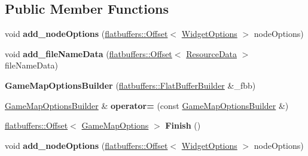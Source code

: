 \subsection*{Public Member Functions}
\begin{DoxyCompactItemize}
\item 
\mbox{\label{structflatbuffers_1_1GameMapOptionsBuilder_a86e4812168cd2031ccef0736fb2c9622}} 
void {\bfseries add\+\_\+node\+Options} (\hyperlink{structflatbuffers_1_1Offset}{flatbuffers\+::\+Offset}$<$ \hyperlink{structflatbuffers_1_1WidgetOptions}{Widget\+Options} $>$ node\+Options)
\item 
\mbox{\label{structflatbuffers_1_1GameMapOptionsBuilder_aa656d921622a241614b306e484c61401}} 
void {\bfseries add\+\_\+file\+Name\+Data} (\hyperlink{structflatbuffers_1_1Offset}{flatbuffers\+::\+Offset}$<$ \hyperlink{structflatbuffers_1_1ResourceData}{Resource\+Data} $>$ file\+Name\+Data)
\item 
\mbox{\label{structflatbuffers_1_1GameMapOptionsBuilder_a3060be639960055b2c1796fcdb5f70f5}} 
{\bfseries Game\+Map\+Options\+Builder} (\hyperlink{classflatbuffers_1_1FlatBufferBuilder}{flatbuffers\+::\+Flat\+Buffer\+Builder} \&\+\_\+fbb)
\item 
\mbox{\label{structflatbuffers_1_1GameMapOptionsBuilder_a727b673a620de85b9562811c508d1fe9}} 
\hyperlink{structflatbuffers_1_1GameMapOptionsBuilder}{Game\+Map\+Options\+Builder} \& {\bfseries operator=} (const \hyperlink{structflatbuffers_1_1GameMapOptionsBuilder}{Game\+Map\+Options\+Builder} \&)
\item 
\mbox{\label{structflatbuffers_1_1GameMapOptionsBuilder_a188d269b583bb889447caca11f181878}} 
\hyperlink{structflatbuffers_1_1Offset}{flatbuffers\+::\+Offset}$<$ \hyperlink{structflatbuffers_1_1GameMapOptions}{Game\+Map\+Options} $>$ {\bfseries Finish} ()
\item 
\mbox{\label{structflatbuffers_1_1GameMapOptionsBuilder_a86e4812168cd2031ccef0736fb2c9622}} 
void {\bfseries add\+\_\+node\+Options} (\hyperlink{structflatbuffers_1_1Offset}{flatbuffers\+::\+Offset}$<$ \hyperlink{structflatbuffers_1_1WidgetOptions}{Widget\+Options} $>$ node\+Options)

\end{DoxyCompactItemize}
